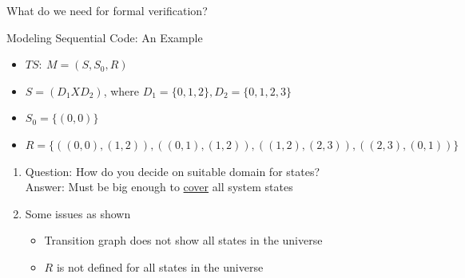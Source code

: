 \documentclass{beamer}
\begin{document}
\begin{frame}{What do we need for formal verification?}
\begin{frame}{Modeling Sequential Code: An Example}
\tiny
\begin{itemize}
\item<3->  $TS:~M = (S, S_0, R)$
\item<3-> $S = (D_1 X D_2)$, where $D_1 = \{0,1,2\}, D_2 = \{0,1,2,3\}$
\item<3-> $S_0 = \{(0,0)\}$
\item<3-> $R = \{ ((0,0),(1,2)), ((0,1),(1,2)), ((1,2),(2,3)), ((2,3),(0,1))  \}$
\end{itemize}
\tiny
\begin{enumerate}
\item<4-> Question: How do you decide on suitable domain for states? \\
Answer: Must be big enough to \underline{cover} all system states
\item <4-> Some issues as shown
\begin{itemize}
\tiny
\item<4-> Transition graph does not show all states in the universe
\item<4-> $R$ is not defined for all states in the universe
\end{itemize}
\end{enumerate}
\end{frame}



\end{frame}
\end{document}
